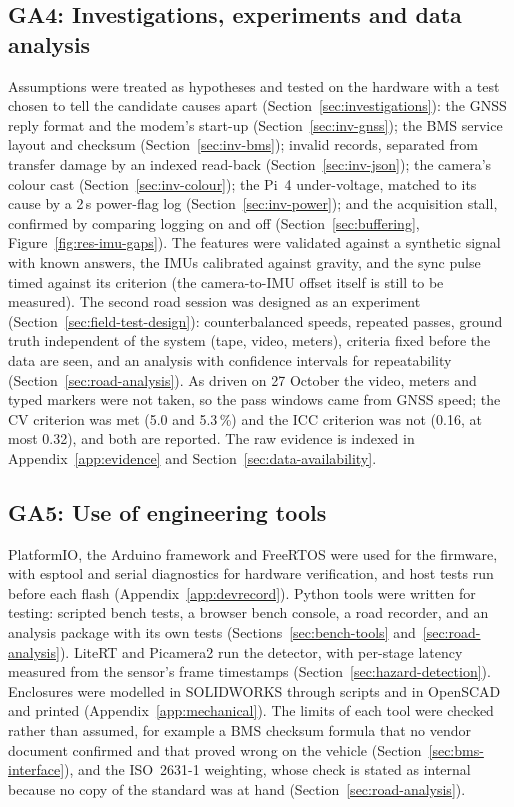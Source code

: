 \subsection*{GA4: Investigations, experiments and data analysis}
Assumptions were treated as hypotheses and tested on the hardware with a test chosen to tell the candidate causes apart (Section~\ref{sec:investigations}): the GNSS reply format and the modem's start-up (Section~\ref{sec:inv-gnss}); the BMS service layout and checksum (Section~\ref{sec:inv-bms}); invalid records, separated from transfer damage by an indexed read-back (Section~\ref{sec:inv-json}); the camera's colour cast (Section~\ref{sec:inv-colour}); the Pi~4 under-voltage, matched to its cause by a 2\,s power-flag log (Section~\ref{sec:inv-power}); and the acquisition stall, confirmed by comparing logging on and off (Section~\ref{sec:buffering}, Figure~\ref{fig:res-imu-gaps}). The features were validated against a synthetic signal with known answers, the IMUs calibrated against gravity, and the sync pulse timed against its criterion (the camera-to-IMU offset itself is still to be measured). The second road session was designed as an experiment (Section~\ref{sec:field-test-design}): counterbalanced speeds, repeated passes, ground truth independent of the system (tape, video, meters), criteria fixed before the data are seen, and an analysis with confidence intervals for repeatability (Section~\ref{sec:road-analysis}). As driven on 27 October the video, meters and typed markers were not taken, so the pass windows came from GNSS speed; the CV criterion was met (5.0 and 5.3\,\%) and the ICC criterion was not (0.16, at most 0.32), and both are reported. The raw evidence is indexed in Appendix~\ref{app:evidence} and Section~\ref{sec:data-availability}.

\subsection*{GA5: Use of engineering tools}
PlatformIO, the Arduino framework and FreeRTOS were used for the firmware, with esptool and serial diagnostics for hardware verification, and host tests run before each flash (Appendix~\ref{app:devrecord}). Python tools were written for testing: scripted bench tests, a browser bench console, a road recorder, and an analysis package with its own tests (Sections~\ref{sec:bench-tools} and~\ref{sec:road-analysis}). LiteRT and Picamera2 run the detector, with per-stage latency measured from the sensor's frame timestamps (Section~\ref{sec:hazard-detection}). Enclosures were modelled in SOLIDWORKS through scripts and in OpenSCAD and printed (Appendix~\ref{app:mechanical}). The limits of each tool were checked rather than assumed, for example a BMS checksum formula that no vendor document confirmed and that proved wrong on the vehicle (Section~\ref{sec:bms-interface}), and the ISO~2631-1 weighting, whose check is stated as internal because no copy of the standard was at hand (Section~\ref{sec:road-analysis}).

